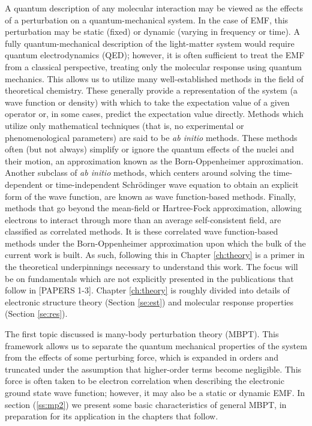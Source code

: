 A quantum description of any molecular interaction may be viewed as
the effects of a perturbation on a quantum-mechanical system. In the
case of EMF, this perturbation may be static (fixed) or dynamic
(varying in frequency or time). A fully quantum-mechanical description
of the light-matter system would require quantum electrodynamics (QED);
however, it is often sufficient to treat the EMF from a classical
perspective, treating only the molecular response using quantum
mechanics.\cite{Barron2004,Helgaker2012} This allows us to utilize many
well-established methods in the field of theoretical chemistry. These
generally provide a representation of the system (a wave function or density)
with which to take the expectation value of a given operator or, in some
cases, predict the expectation value directly.\cite{Szabo1996} Methods
which utilize only mathematical techniques (that is, no experimental
or phenomenological parameters) are said to be \textit{ab initio}
methods. These methods often (but not always) simplify or ignore the
quantum effects of the nuclei and their motion, an approximation known as
the Born-Oppenheimer approximation.\cite{born1927zur} Another subclass of
\textit{ab initio} methods, which centers around solving the time-dependent
or time-independent Schr\"odinger wave equation to obtain an explicit form
of the wave function, are known as wave function-based methods. Finally,
methods that go beyond the mean-field or Hartree-Fock approximation,
allowing electrons to interact through more than an average self-consistent field,
are classified as correlated methods.  It is these correlated wave
function-based methods under the Born-Oppenheimer approximation upon which
the bulk of the current work is built. As such, following this in Chapter
\ref{ch:theory} is a primer in the theoretical underpinnings necessary to
understand this work.
The focus will be on fundamentals which are not explicitly presented in the
publications that follow in [PAPERS 1-3]. Chapter \ref{ch:theory} is roughly
divided into details of electronic structure theory (Section \ref{se:est})
and molecular response properties (Section \ref{se:res}).

The first topic discussed is many-body perturbation theory
(MBPT).\cite{Bartlett2009} This framework allows us to separate the quantum
mechanical properties of the system from the effects of some perturbing
force, which is expanded in orders and truncated under the assumption
that higher-order terms become negligible.  This force is often taken to
be electron correlation when describing the electronic ground state wave
function;\cite{Moller1934} however, it may also be a static or dynamic
EMF. In section (\ref{ss:mp2}) we present some basic characteristics of
general MBPT, in preparation for its application in the chapters that follow.

